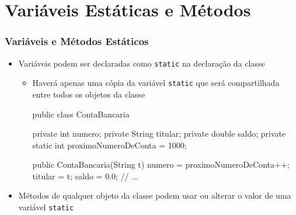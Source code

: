 \documentclass[xcolor={dvipsnames,table},aspectratio=169]{beamer}
\begin{document}
\section{Variáveis Estáticas e Métodos}

\begin{frame}[fragile]\frametitle{Variáveis e Métodos Estáticos}
\begin{itemize}
	\item Variáveis podem ser declaradas como \texttt{static} na declaração da classe
	\begin{itemize}
		\item Haverá apenas uma cópia da variável \texttt{static} que será compartilhada entre todos os objetos da classe
{\scriptsize
\begin{javacode}
public class ContaBancaria {
  private int numero;
  private String titular;
  private double saldo;
  private static int proximoNumeroDeConta = 1000;

  public ContaBancaria(String t) {
    numero = proximoNumeroDeConta++;
    titular = t;
    saldo = 0.0;
  }
  // ...
}
\end{javacode}
}
	\end{itemize}
	\item Métodos de qualquer objeto da classe podem usar ou alterar o valor de uma variável \texttt{static}
\end{itemize}
\end{frame}
\end{document}
